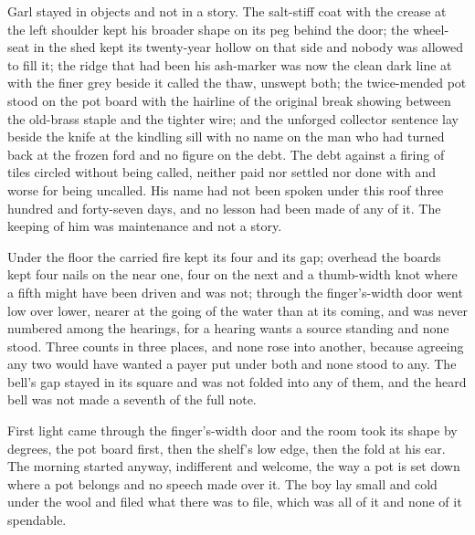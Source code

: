 Garl stayed in objects and not in a story. The salt-stiff coat with the crease at the left shoulder kept his broader shape on its peg behind the door; the wheel-seat in the shed kept its twenty-year hollow on that side and nobody was allowed to fill it; the ridge that had been his ash-marker was now the clean dark line at  with the finer grey beside it called the thaw, unswept both; the twice-mended pot stood on the pot board with the hairline of the original break showing between the old-brass staple and the tighter wire; and the unforged collector sentence lay beside the knife at the kindling sill with no name on the man who had turned back at the frozen ford and no figure on the debt. The debt against a firing of tiles circled without being called, neither paid nor settled nor done with and worse for being uncalled. His name had not been spoken under this roof three hundred and forty-seven days, and no lesson had been made of any of it. The keeping of him was maintenance and not a story.

Under the floor the carried fire kept its four and its gap; overhead the boards kept four nails on the near one, four on the next and a thumb-width knot where a fifth might have been driven and was not; through the finger's-width door  went low over lower, nearer at the going of the water than at its coming, and was never numbered among the hearings, for a hearing wants a source standing and none stood. Three counts in three places, and none rose into another, because agreeing any two would have wanted a payer put under both and none stood to any. The bell's gap stayed in its square and was not folded into any of them, and the heard bell was not made a seventh of the full note.

First light came through the finger's-width door and the room took its shape by degrees, the pot board first, then the shelf's low edge, then the fold at his ear. The morning started anyway, indifferent and welcome, the way a pot is set down where a pot belongs and no speech made over it. The boy lay small and cold under the wool and filed what there was to file, which was all of it and none of it spendable.

\scenebreak

